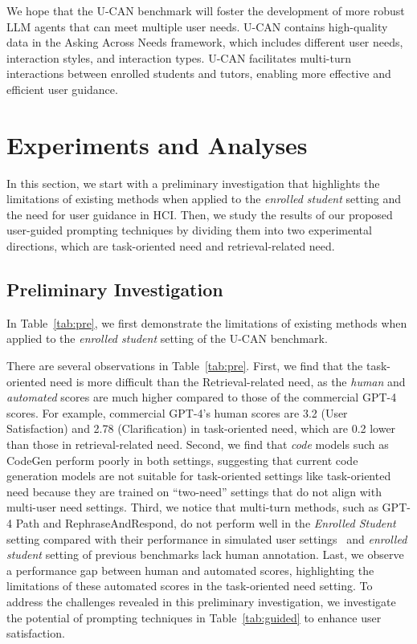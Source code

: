 We hope that the U-CAN benchmark will foster the development of more robust LLM agents that can meet multiple user needs. U-CAN contains high-quality data in the Asking Across Needs framework, which includes different user needs, interaction styles, and interaction types. U-CAN facilitates multi-turn interactions between enrolled students and tutors, enabling more effective and efficient user guidance.




\section{Experiments and Analyses}

\label{sec:experiment}
In this section, we start with a preliminary investigation that highlights the limitations of existing methods when applied to the \textit{enrolled student} setting and the need for user guidance in HCI. Then, we study the results of our proposed user-guided prompting techniques by dividing them into two experimental directions, which are task-oriented need and retrieval-related need.
\subsection{Preliminary Investigation}
\label{subsec:preliminary}
In Table~\ref{tab:pre}, we first demonstrate the limitations of existing methods when applied to the \textit{enrolled student} setting of the U-CAN benchmark.

There are several observations in Table~\ref{tab:pre}.
First, we find that the task-oriented need is more difficult than the Retrieval-related need, as the \textit{human} and \textit{automated} scores are much higher compared to those of the commercial GPT-4 scores.
For example, commercial GPT-4's human scores are 3.2 (User Satisfaction) and 2.78 (Clarification) in task-oriented need, which are 0.2 lower than those in retrieval-related need.
Second, we find that \textit{code} models such as CodeGen perform poorly in both settings, suggesting that current code generation models are not suitable for task-oriented settings like task-oriented need because they are trained on ``two-need'' settings that do not align with multi-user need settings.
Third, we notice that multi-turn methods, such as GPT-4 Path and RephraseAndRespond, do not perform well in the \textit{Enrolled Student} setting compared with their performance in simulated user settings~\citep{rethink_rephrase} and \textit{enrolled student} setting of previous benchmarks lack human annotation.
Last, we observe a performance gap between human and automated scores, highlighting the limitations of these automated scores in the task-oriented need setting.
To address the challenges revealed in this preliminary investigation, we investigate the potential of prompting techniques in Table~\ref{tab:guided} to enhance user satisfaction.



